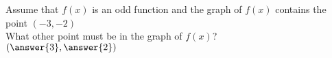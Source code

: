\documentclass{ximera}
\author{David Kish}
\begin{document}
\begin{exercise}
Assume that $f(x)$ is an odd function and the graph of $f(x)$ contains the point $(-3,-2)$\\
What other point must be in the graph of $f(x)$?\\
$(\answer{3},\answer{2})$
\end{exercise}
\end{document}
